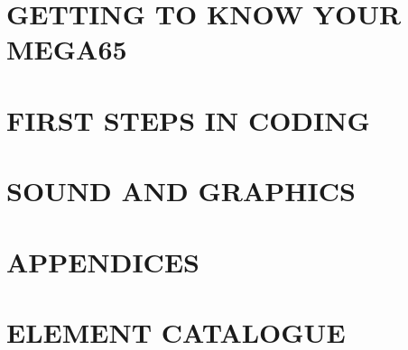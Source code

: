 \documentclass{book}
\begin{document}


\cleardoublepage
{}

\part{GETTING TO KNOW YOUR MEGA65}




\part{FIRST STEPS IN CODING}






\part{SOUND AND GRAPHICS}





\part{APPENDICES}

\begin{appendices}

  
  
  
  
  
  
  
  
  
  
  
  
  
  
  
  
  
  
  

\end{appendices}


\nocite{*}



\printindex

\part{ELEMENT CATALOGUE}
\end{document}
